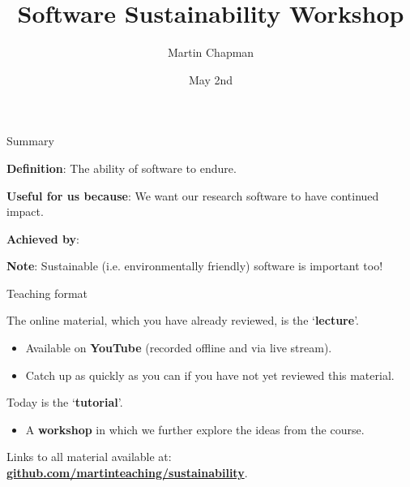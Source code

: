 \documentclass[10pt, dvipsnames, table, aspectratio=169]{beamer}
\title{Software Sustainability Workshop}
\subtitle{}
\date{May 2nd}
\author{Martin Chapman}
\institute{King's College London}
\begin{document}



\begin{frame}[fragile]{Summary}

\textbf{Definition}: The ability of software to endure.

\textbf{Useful for us because}: We want our research software to have continued impact.

\textbf{Achieved by}:

\begin{center}
    
\end{center}

\textbf{Note}: Sustainable (i.e. environmentally friendly) software is important too!

\end{frame}


\begin{frame}[fragile]{Teaching format}

The online material, which you have already reviewed, is the `\textbf{lecture}'.

\begin{itemize}

    \item Available on \textbf{YouTube} (recorded offline and via live stream).

    \item Catch up as quickly as you can if you have not yet reviewed this material.

\end{itemize}

Today is the `\textbf{tutorial}'.

\begin{itemize}

    \item A \textbf{workshop} in which we further explore the ideas from the course.

\end{itemize}

Links to all material available at:
\href{https://github.com/martinteaching/sustainability}{\textbf{github.com/martinteaching/sustainability}}.

\end{frame}
\end{document}
